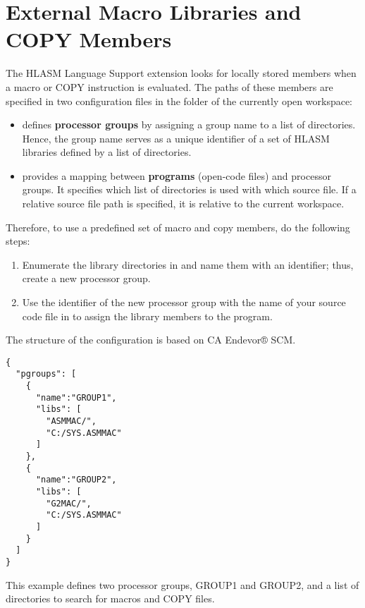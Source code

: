 \section{External Macro Libraries and COPY Members}
\label{sec:configuration}

The HLASM Language Support extension looks for locally stored members when a macro or COPY instruction is evaluated. The paths of these members are specified in two configuration files in the  folder of the currently open workspace:
\begin{itemize}
	\item  {} defines \textbf{processor groups} by assigning a group name to a list of directories. Hence, the group name serves as a unique identifier of a set of HLASM libraries defined by a list of directories.
	
	
	\item  {} provides a mapping between \textbf{programs} (open-code files) and processor groups. It specifies which list of directories is used with which source file. If a relative source file path is specified, it is relative to the current workspace.
\end{itemize}

Therefore, to use a predefined set of macro and copy members, do the following steps: 
\begin{enumerate}
	\item Enumerate the library directories in  and name them with an identifier; thus, create a new processor group.
	\item Use the identifier of the new processor group with the name of your source code file in  to assign the library members to the program.
\end{enumerate}

The structure of the configuration is based on CA Endevor® SCM.


\begin{listing}
	\begin{verbatim}
{
  "pgroups": [
    {
      "name":"GROUP1",
      "libs": [
        "ASMMAC/",
        "C:/SYS.ASMMAC"
      ]
    },
    {
      "name":"GROUP2",
      "libs": [
        "G2MAC/",
        "C:/SYS.ASMMAC"
      ]
    }
  ]
}
	\end{verbatim}
	\caption{This example defines two processor groups, GROUP1 and GROUP2, and a list of directories to search for macros and COPY files.}
	\label{lst:ex1}
\end{listing}

